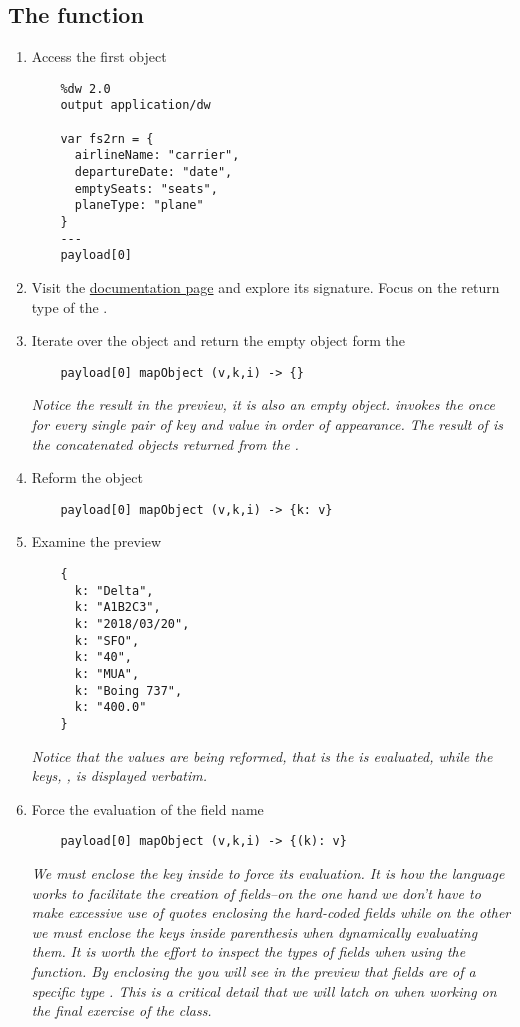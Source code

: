 \subsection{The  function}
\begin{enumerate}[resume*]
\item Access the first object
  \begin{lstlisting}
    %dw 2.0
    output application/dw
    
    var fs2rn = {
      airlineName: "carrier",
      departureDate: "date",
      emptySeats: "seats",
      planeType: "plane"
    }
    ---
    payload[0]
  \end{lstlisting}
\item Visit the \href{https://docs.mulesoft.com/mule-runtime/4.3/dw-core-functions-mapobject}{ documentation page} and explore its signature.  Focus on the return type of the \les{}.
\item Iterate over the object and return the empty object form the \les
  \begin{lstlisting}
    payload[0] mapObject (v,k,i) -> {}
  \end{lstlisting}
  \emph{
    Notice the result in the preview, it is also an empty object.   invokes the \les{} once for every single pair of key and value in order of appearance.  The result of  is the concatenated objects returned from the \les.
  }
\item Reform the object
  \begin{lstlisting}
    payload[0] mapObject (v,k,i) -> {k: v}
  \end{lstlisting}
\item Examine the preview
  \begin{lstlisting}
    {
      k: "Delta",
      k: "A1B2C3",
      k: "2018/03/20",
      k: "SFO",
      k: "40",
      k: "MUA",
      k: "Boing 737",
      k: "400.0"
    }
  \end{lstlisting}
  \emph{
    Notice that the values are being reformed, that is the  is evaluated, while the keys, , is displayed verbatim.
  }
\item Force the evaluation of the field name
  \begin{lstlisting}
    payload[0] mapObject (v,k,i) -> {(k): v}
  \end{lstlisting}
  \emph{
    We must enclose the key inside \ttt{()} to force its evaluation.  It is how the language works to facilitate the creation of fields--on the one hand we don't have to make excessive use of quotes enclosing the hard-coded fields while on the other we must enclose the keys inside parenthesis when dynamically evaluating them.
  }
  \newline
  \emph{
    It is worth the effort to inspect the types of fields when using the  function.  By enclosing the  you will see in the preview that fields are of a specific type .  This is a critical detail that we will latch on when working on the final exercise of the class. 
  }
\end{enumerate}

